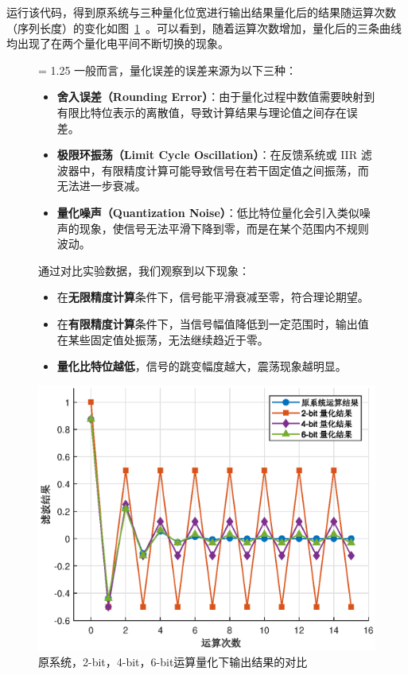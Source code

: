 \documentclass[lang=cn,newtx,10pt,scheme=chinese]{elegantbook}
\begin{document}
运行该代码，得到原系统与三种量化位宽进行输出结果量化后的结果随运算次数（序列长度）的变化如图~\ref{fig:2-3}~。可以看到，随着运算次数增加，量化后的三条曲线均出现了在两个量化电平间不断切换的现象。

\begin{figure}[htbp]
  \centering
  \begin{minipage}{0.5\linewidth}
    \baselineskip = 1.25 \baselineskip
    一般而言，量化误差的误差来源为以下三种：
    \begin{itemize}
        \item \textbf{舍入误差（Rounding Error）}：由于量化过程中数值需要映射到有限比特位表示的离散值，导致计算结果与理论值之间存在误差。
        \item \textbf{极限环振荡（Limit Cycle Oscillation）}：在反馈系统或 IIR 滤波器中，有限精度计算可能导致信号在若干固定值之间振荡，而无法进一步衰减。
        \item \textbf{量化噪声（Quantization Noise）}：低比特位量化会引入类似噪声的现象，使信号无法平滑下降到零，而是在某个范围内不规则波动。
    \end{itemize}

    通过对比实验数据，我们观察到以下现象：

    \begin{itemize}
        \item 在\textbf{无限精度计算}条件下，信号能平滑衰减至零，符合理论期望。
        \item 在\textbf{有限精度计算}条件下，当信号幅值降低到一定范围时，输出值在某些固定值处振荡，无法继续趋近于零。
        \item \textbf{量化比特位越低}，信号的跳变幅度越大，震荡现象越明显。
    \end{itemize}


  \end{minipage}
  \hfill
  \begin{minipage}{0.45\linewidth}
    \centering
    \includegraphics[width=0.95\linewidth]{figure/exp2/2-3.eps}
    \caption{原系统，2-bit，4-bit，6-bit运算量化下输出结果的对比}
    \label{fig:2-3}
  \end{minipage}
\end{figure}
\end{document}
